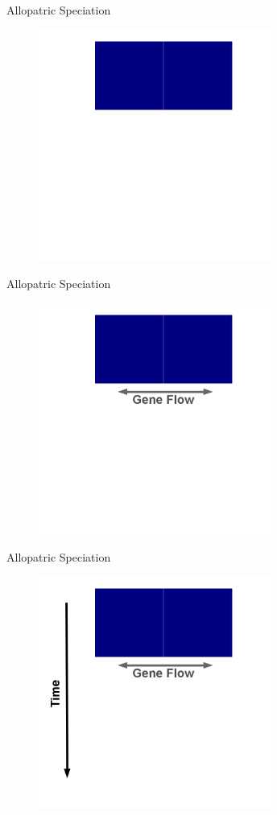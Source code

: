 \documentclass[t,10pt]{beamer}
\begin{document}
\begin{frame}[label={sec:orgheadline4}]{Allopatric Speciation}
\begin{figure}[htb]
\centering
\includegraphics[width=3in,height=3in]{./Figures/Allopatric_Speciation_Figure/png/1_Allopatric_Speciation.png}
\end{figure}
\end{frame}
\begin{frame}[label={sec:orgheadline5}]{Allopatric Speciation}
\begin{figure}[htb]
\centering
\includegraphics[width=3in,height=3in]{./Figures/Allopatric_Speciation_Figure/png/2_Allopatric_Speciation.png}
\end{figure}
\end{frame}
\begin{frame}[label={sec:orgheadline6}]{Allopatric Speciation}
\begin{figure}[htb]
\centering
\includegraphics[width=3in,height=3in]{./Figures/Allopatric_Speciation_Figure/png/3_Allopatric_Speciation.png}
\end{figure}
\end{frame}
\end{document}
